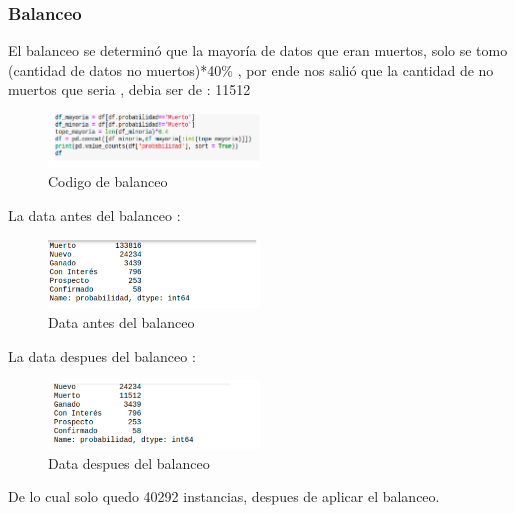 \documentclass[conference]{IEEEtran}
\begin{document}
\subsubsection{Balanceo}
El balanceo se determinó que la mayoría de datos que eran muertos, solo se tomo 
(cantidad de datos no muertos)*40\% , por ende nos salió que la cantidad de no muertos que seria , debia ser de : 11512
\begin{figure}[H]
    \centering
    \includegraphics[width=0.5\textwidth]{preprocesamiento/codigo_balanceo}
    \caption{Codigo de balanceo}
    \label{fig:codigo_balanceo}
\end{figure}
La data antes del balanceo : 
\begin{figure}[H]
    \centering
    \includegraphics[width=0.5\textwidth]{preprocesamiento/data_antes_balanceo}
    \caption{Data antes del balanceo}
    \label{fig:data_antes_balanceo}
\end{figure}
La data despues del balanceo : 
\begin{figure}[H]
    \centering
    \includegraphics[width=0.5\textwidth]{preprocesamiento/data_despues_balanceo}
    \caption{Data despues del balanceo}
    \label{fig:data_despues_balanceo}
\end{figure}

De lo cual solo quedo 40292 instancias, despues de aplicar el balanceo.
\end{document}
